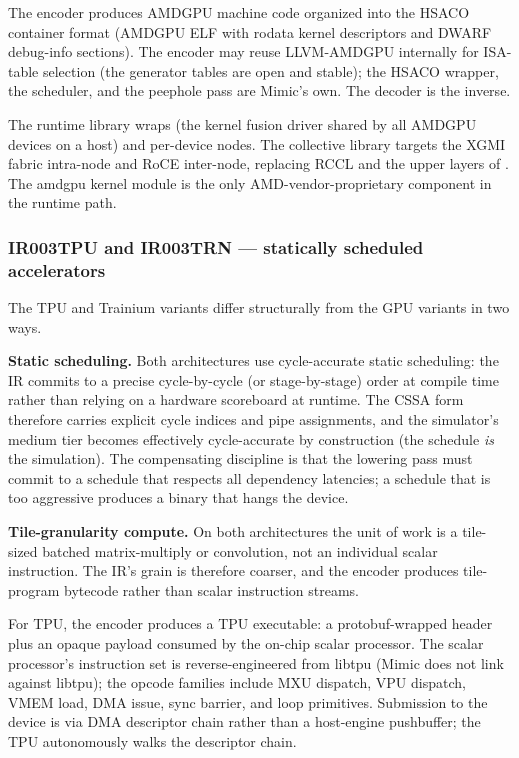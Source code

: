 The encoder produces AMDGPU machine code organized into the HSACO container format (AMDGPU ELF with rodata kernel descriptors and DWARF debug-info sections).
The encoder may reuse LLVM-AMDGPU internally for ISA-table selection (the generator tables are open and stable); the HSACO wrapper, the scheduler, and the peephole pass are Mimic's own.
The decoder is the inverse.

The runtime library wraps  (the kernel fusion driver shared by all AMDGPU devices on a host) and per-device  nodes.
The collective library targets the XGMI fabric intra-node and RoCE inter-node, replacing RCCL and the upper layers of .
The amdgpu kernel module is the only AMD-vendor-proprietary component in the runtime path.

\subsubsection{IR003TPU and IR003TRN --- statically scheduled accelerators}
\label{sec:ir003-tpu-trn}

The TPU and Trainium variants differ structurally from the GPU variants in two ways.

\textbf{Static scheduling.}
Both architectures use cycle-accurate static scheduling: the IR commits to a precise cycle-by-cycle (or stage-by-stage) order at compile time rather than relying on a hardware scoreboard at runtime.
The CSSA form therefore carries explicit cycle indices and pipe assignments, and the simulator's medium tier becomes effectively cycle-accurate by construction (the schedule \emph{is} the simulation).
The compensating discipline is that the lowering pass must commit to a schedule that respects all dependency latencies; a schedule that is too aggressive produces a binary that hangs the device.

\textbf{Tile-granularity compute.}
On both architectures the unit of work is a tile-sized batched matrix-multiply or convolution, not an individual scalar instruction.
The IR's grain is therefore coarser, and the encoder produces tile-program bytecode rather than scalar instruction streams.

For TPU, the encoder produces a TPU executable: a protobuf-wrapped header plus an opaque payload consumed by the on-chip scalar processor.
The scalar processor's instruction set is reverse-engineered from libtpu (Mimic does not link against libtpu); the opcode families include MXU dispatch, VPU dispatch, VMEM load, DMA issue, sync barrier, and loop primitives.
Submission to the device is via DMA descriptor chain rather than a host-engine pushbuffer; the TPU autonomously walks the descriptor chain.

